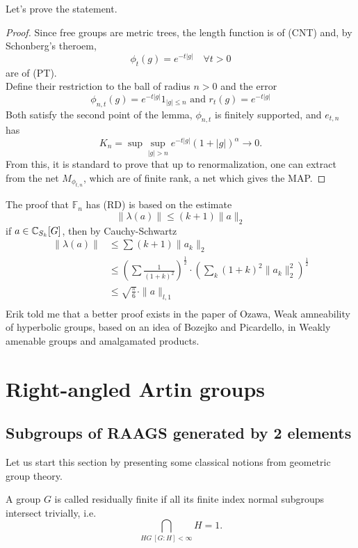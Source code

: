 Let's prove the statement.

\begin{proof}
Since free groups are metric trees, the length function is of (CNT) and, by Schonberg's theroem, 
\[\phi_t(g)=e^{-t|g|} \quad \forall t>0\]
are of (PT). \\

Define their restriction to the ball of radius $n>0$ and the error
\[\phi_{n,t}(g)=e^{-t|g|}1_{|g|\leq n}  \text{ and } r_t(g)=e^{-t|g|} \]
Both satisfy the second point of the lemma, $\phi_{n,t}$ is finitely supported, and $e_{t,n}$ has 
\[K_n = \sup  \sup_{|g|> n } e^{-t|g|}(1+|g|)^\alpha \rightarrow 0. \]
From this, it is standard to prove that up to renormalization, one can extract from the net $M_{\phi_{t,n}}$, which are of finite rank, a net which gives the MAP.
\end{proof}

The proof that $\mathbb F_n$ has (RD) is based on the estimate \[\|\lambda(a) \| \leq (k+1)\|a\|_2\]
if $a\in \mathbb C_{S_k}[G]$, then by Cauchy-Schwartz
\[\begin{split}
\|\lambda (a) \| & \leq \sum (k+1)\|a_k\|_2 \\
		& \leq (\sum \frac{1}{(1+k)^2} )^\frac{1}{2} \cdot (\sum_k (1+k)^2  \|a_k\|_2^2)^\frac{1}{2} \\	
		& \leq \sqrt{\frac{\pi}{6}} \cdot \|a\|_{l, 1}\\
 \end{split}\]
Erik told me that a better proof exists in the paper of Ozawa, Weak amneability of hyperbolic groups, based on an idea of Bozejko and Picardello, in Weakly amenable groups and amalgamated products.
 
\newpage
\section{Right-angled Artin groups}

\subsection{Subgroups of RAAGS generated by 2 elements}

Let us start this section by presenting some classical notions from geometric group theory.

\begin{definition}
A group $G$ is called residually finite if all its finite index normal subgroups intersect trivially, i.e.
\[\bigcap_{H G \ [G:H] < \infty} H = 1.\]
\end{definition}

